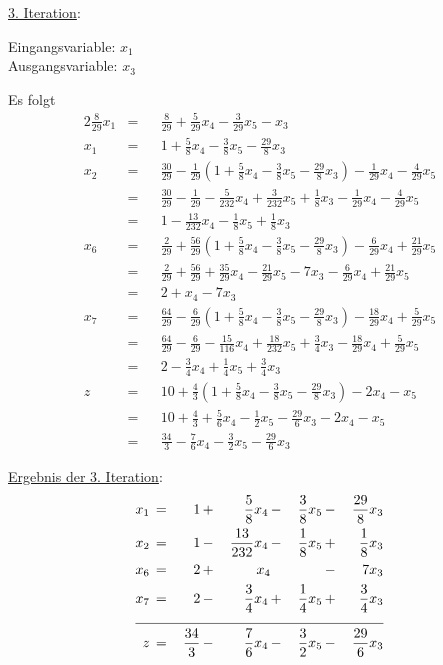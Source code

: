 \documentclass[10pt,a4paper,oneside,ngerman,numbers=noenddot]{scrartcl}
\begin{document}
		\underline{3. Iteration}:
		
		Eingangsvariable: $x_{1}$\\
		Ausgangsvariable: $x_{3}$
		
		Es folgt
		\begin{alignat*}{2}
			\frac{8}{29}x_{1} &=&& \frac{8}{29} + \frac{5}{29}x_{4} - \frac{3}{29}x_{5} - x_{3} \\
			x_{1} &=&& 1 + \frac{5}{8}x_{4} - \frac{3}{8}x_{5} - \frac{29}{8}x_{3} \\
			x_{2} &=&& \frac{30}{29} - \frac{1}{29}\left(1 + \frac{5}{8}x_{4} - \frac{3}{8}x_{5} - \frac{29}{8}x_{3}\right) - \frac{1}{29}x_{4} - \frac{4}{29}x_{5} \\
			&=&& \frac{30}{29} - \frac{1}{29} - \frac{5}{232}x_{4} +  \frac{3}{232}x_{5} + \frac{1}{8}x_{3} - \frac{1}{29}x_{4} - \frac{4}{29}x_{5} \\
			&=&& 1 - \frac{13}{232}x_{4} - \frac{1}{8}x_{5} + \frac{1}{8}x_{3} \\
			x_{6} &=&& \frac{2}{29} + \frac{56}{29}\left(1 + \frac{5}{8}x_{4} - \frac{3}{8}x_{5} - \frac{29}{8}x_{3}\right) - \frac{6}{29}x_{4} + \frac{21}{29}x_{5} \\
			&=&& \frac{2}{29} + \frac{56}{29} + \frac{35}{29}x_{4} - \frac{21}{29}x_{5} - 7x_{3} - \frac{6}{29}x_{4} + \frac{21}{29}x_{5} \\
			&=&& 2 + x_{4} - 7x_{3} \\
			x_{7} &=&& \frac{64}{29} - \frac{6}{29}\left(1 + \frac{5}{8}x_{4} - \frac{3}{8}x_{5} - \frac{29}{8}x_{3}\right) - \frac{18}{29}x_{4} + \frac{5}{29}x_{5} \\
			&=&& \frac{64}{29} - \frac{6}{29} - \frac{15}{116}x_{4} + \frac{18}{232}x_{5} + \frac{3}{4}x_{3} - \frac{18}{29}x_{4} + \frac{5}{29}x_{5} \\
			&=&& 2 - \frac{3}{4}x_{4} + \frac{1}{4}x_{5} + \frac{3}{4}x_{3} \\
			z &=&& 10 + \frac{4}{3}\left(1 + \frac{5}{8}x_{4} - \frac{3}{8}x_{5} - \frac{29}{8}x_{3}\right) - 2x_{4} - x_{5} \\
			&=&& 10 + \frac{4}{3} + \frac{5}{6}x_{4} - \frac{1}{2}x_{5} - \frac{29}{6}x_{3} - 2x_{4} - x_{5} \\
			&=&& \frac{34}{3} - \frac{7}{6}x_{4} - \frac{3}{2}x_{5} - \frac{29}{6}x_{3}
		\end{alignat*}
		
		\underline{Ergebnis der 3. Iteration}:
		\begin{alignat*}{5}
			x_{1} \,&=&\, 1 \,&+&\, \frac{5}{8}x_{4} \,&-&\, \frac{3}{8}x_{5} \,&-&\, \frac{29}{8}x_{3} \\
			x_{2} \,&=&\, 1 \,&-&\, \frac{13}{232}x_{4} \,&-&\, \frac{1}{8}x_{5} \,&+&\, \frac{1}{8}x_{3} \\
			x_{6} \,&=&\, 2 \,&+&\, x_{4} && \,&-&\, 7x_{3} \\
			x_{7} \,&=&\, 2 \,&-&\, \frac{3}{4}x_{4} \,&+&\, \frac{1}{4}x_{5} \,&+&\, \frac{3}{4}x_{3} \\ \cline{1 - 9}
			z \,&=&\, \frac{34}{3} \,&-&\, \frac{7}{6}x_{4} \,&-&\, \frac{3}{2}x_{5} \,&-&\, \frac{29}{6}x_{3}
		\end{alignat*}
		
\end{document}
